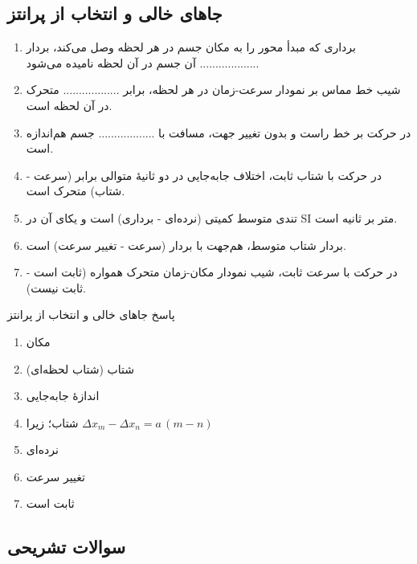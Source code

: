 \documentclass[12pt, a4paper]{article}
\begin{document}
\subsection{جاهای خالی و انتخاب از پرانتز}
\begin{enumerate}
    \item برداری که مبدأ محور را به مکان جسم در هر لحظه وصل می‌کند، بردار .................. آن جسم در آن لحظه نامیده می‌شود. 
    \item شیب خط مماس بر نمودار سرعت-زمان در هر لحظه، برابر .................. متحرک در آن لحظه است. 
    \item در حرکت بر خط راست و بدون تغییر جهت، مسافت با .................. جسم هم‌اندازه است. 
    \item در حرکت با شتاب ثابت، اختلاف جابه‌جایی در دو ثانیهٔ متوالی برابر (سرعت - شتاب) متحرک است. 
    \item تندی متوسط کمیتی (نرده‌ای - برداری) است و یکای آن در SI متر بر ثانیه است. 
    \item بردار شتاب متوسط، هم‌جهت با بردار (سرعت - تغییر سرعت) است. 
    \item در حرکت با سرعت ثابت، شیب نمودار مکان-زمان متحرک همواره (ثابت است - ثابت نیست). 
\end{enumerate}

\begin{answerbox}{پاسخ جاهای خالی و انتخاب از پرانتز}
\begin{enumerate}
    \item مکان
    \item شتاب (شتاب لحظه‌ای)
    \item اندازهٔ جابه‌جایی
    \item شتاب؛ زیرا $\Delta x_m - \Delta x_n = a\,(m-n)$
    \item نرده‌ای
    \item تغییر سرعت
    \item ثابت است
\end{enumerate}
\end{answerbox}

\vspace{0.3cm}

\subsection*{سوالات تشریحی}
\end{document}
